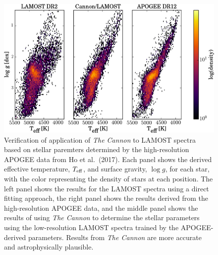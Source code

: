 \documentclass[oneside,11pt]{amsart}
\newcommand{\comment}[2][todo]{{\color{#1}[[{\bf #2}]]}}
\begin{document}
%
%
%
%
%
%

\begin{figure}[h!]
%
\vskip -0.1in
%
\includegraphics[width=\textwidth]{CannonLAMOST.jpg}
%
\caption{\small Verification of application of {\it The Cannon} to
LAMOST spectra based on stellar paremters determined by the
high-resolution APOGEE data from Ho et al.\ (2017).  Each panel shows
the derived effective temperature, $T_{\rm eff}$, and surface gravity,
$\log g$, for each star, with the color representing the density of
stars at each position.  The left panel shows the results for the LAMOST
spectra using a direct fitting approach, the right panel shows the
results derived from the high-resolution APOGEE data, and the middle
panel shows the results of using {\it The Cannon} to determine the
stellar parameters using the low-resolution LAMOST spectra trained by
the APOGEE-derived parameters.  Results from {\it The Cannon} are more
accurate and astrophysically plausible.}
%
\label{fig:Cannon}
%
\end{figure}
\end{document}
